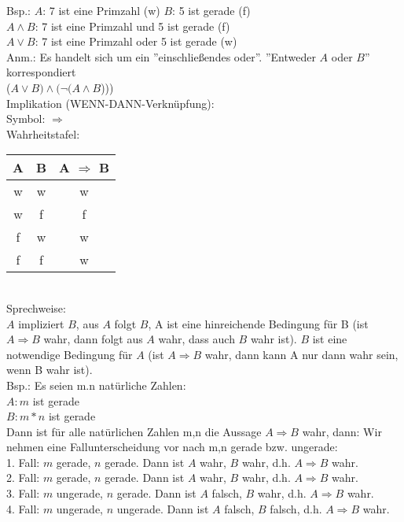 \documentclass[10pt,a4paper,numbers=endperiod]{scrartcl}
\theoremstyle{definition}
\begin{document}
Bsp.: $A$: 7 ist eine Primzahl (w) $B$: 5 ist gerade (f)\\

$A \wedge B$: 7 ist eine Primzahl und 5 ist gerade (f)\\
$A \vee B$: 7 ist eine Primzahl oder 5 ist gerade (w)\\

Anm.: Es handelt sich um ein ''einschließendes oder''. ''Entweder $A$ oder $B$'' korrespondiert\\    
($A \vee B) \wedge (\neg(A \wedge B$)))\\

Implikation (WENN-DANN-Verknüpfung):\\
Symbol: $\Rightarrow$\\
Wahrheitstafel: 
\begin{tabular}{c|c|c}
	A & B & A $\Rightarrow$ B\\
	\hline
	w & w & w \\
	w & f & f \\
	f & w & w \\
	f & f & w \\
\end{tabular}\\

Sprechweise:\\
$A$ impliziert $B$, aus $A$ folgt $B$, A ist eine hinreichende Bedingung für B (ist $A \Rightarrow B$ wahr, dann folgt aus $A$ wahr, dass auch $B$ wahr ist). $B$ ist eine notwendige Bedingung für $A$ (ist $A \Rightarrow B$ wahr, dann kann A nur dann wahr sein, wenn B wahr ist).\\

Bsp.: Es seien m.n natürliche Zahlen:\\ 
$A: m$ ist gerade\\
$B: m*n$ ist gerade\\
Dann ist für alle natürlichen Zahlen m,n die Aussage $A \Rightarrow B$ wahr, dann: Wir nehmen eine Fallunterscheidung vor nach m,n gerade bzw. ungerade:\\

1. Fall: $m$ gerade, $n$ gerade. Dann ist $A$ wahr, $B$ wahr, d.h. $A \Rightarrow B$ wahr.\\
2. Fall: $m$ gerade, $n$ gerade. Dann ist $A$ wahr, $B$ wahr, d.h. $A \Rightarrow B$ wahr.\\
3. Fall: $m$ ungerade, $n$ gerade. Dann ist $A$ falsch, $B$ wahr, d.h. $A \Rightarrow B$ wahr.\\
4. Fall: $m$ ungerade, $n$ ungerade. Dann ist $A$ falsch, $B$ falsch, d.h. $A \Rightarrow B$ wahr.\\
\end{document}
